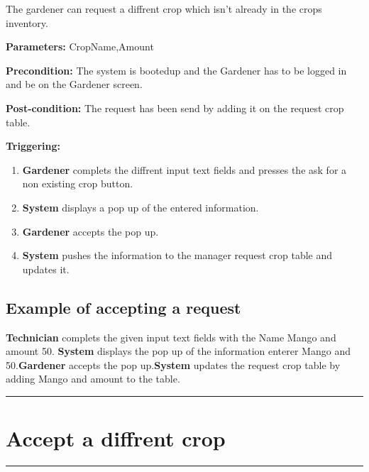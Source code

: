 The gardener can request a diffrent crop which isn't already in the crops
inventory.
\begin{description}
\item \textbf{Parameters:} CropName,Amount
\item \textbf{Precondition:} The system is bootedup and the Gardener has to be
logged in and be on the Gardener screen.
\item \textbf{Post-condition:} The request has been send by adding it on the
request crop table.
\item \textbf{Triggering:}
\begin{enumerate}
\item \textbf{Gardener} complets the diffrent input text fields and presses
the ask for a non existing crop button.
\item \textbf{System} displays a pop up of the entered information.
\item \textbf{Gardener} accepts the pop up.
\item \textbf{System} pushes the information to the manager request crop table
and updates it.
\end{enumerate}
\end{description}

\subsection{Example of accepting a request}
\textbf{Technician} complets the given input text fields with the Name Mango and
amount 50. \textbf{System} displays the pop up of the information enterer Mango
and 50.\textbf{Gardener} accepts the pop up.\textbf{System} updates the request
crop table by adding Mango and amount to the table.
\hfill
\vspace{0.5cm}
\hrule



\section{Accept a diffrent crop}

\hrule
\hfill
\vspace{0.5cm}

\label{operation:Accept a diffrent crop}

